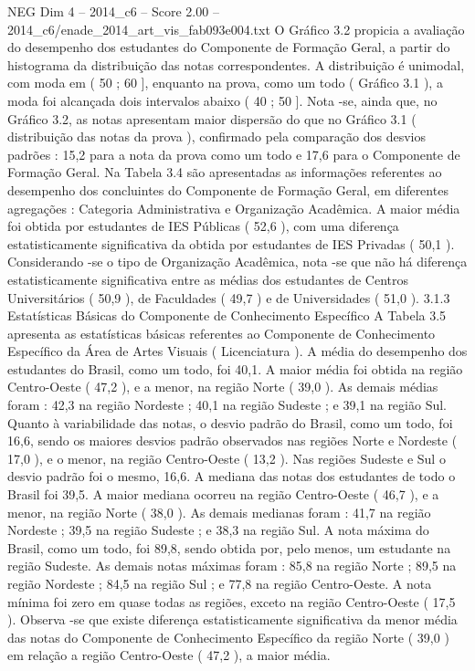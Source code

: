\begin{textsample}{NEG Dim 4 – 2014\_c6 – Score 2.00 – 2014\_c6/enade\_2014\_art\_vis\_fab093e004.txt}
O Gráfico 3.2 propicia a avaliação do desempenho dos estudantes do Componente de Formação Geral, a partir do histograma da distribuição das notas correspondentes.
A distribuição é unimodal, com moda em ( 50 ; 60 ], enquanto na prova, como um todo ( Gráfico 3.1 ), a moda foi alcançada dois intervalos abaixo ( 40 ; 50 ].
Nota -se, ainda que, no Gráfico 3.2, as notas apresentam maior dispersão do que no Gráfico 3.1 ( distribuição das notas da prova ), confirmado pela comparação dos desvios padrões : 15,2 para a nota da prova como um todo e 17,6 para o Componente de Formação Geral.
Na Tabela 3.4 são apresentadas as informações referentes ao desempenho dos concluintes do Componente de Formação Geral, em diferentes agregações : Categoria Administrativa e Organização Acadêmica.
A maior média foi obtida por estudantes de IES Públicas ( 52,6 ), com uma diferença estatisticamente significativa da obtida por estudantes de IES Privadas ( 50,1 ).
Considerando -se o tipo de Organização Acadêmica, nota -se que não há diferença estatisticamente significativa entre as médias dos estudantes de Centros Universitários ( 50,9 ), de Faculdades ( 49,7 ) e de Universidades ( 51,0 ). 3.1.3 Estatísticas Básicas do Componente de Conhecimento Específico A Tabela 3.5 apresenta as estatísticas básicas referentes ao Componente de Conhecimento Específico da Área de Artes Visuais ( Licenciatura ).
A média do desempenho dos estudantes do Brasil, como um todo, foi 40,1.
A maior média foi obtida na região Centro-Oeste ( 47,2 ), e a menor, na região Norte ( 39,0 ).
As demais médias foram : 42,3 na região Nordeste ; 40,1 na região Sudeste ; e 39,1 na região Sul.
Quanto à variabilidade das notas, o desvio padrão do Brasil, como um todo, foi 16,6, sendo os maiores desvios padrão observados nas regiões Norte e Nordeste ( 17,0 ), e o menor, na região Centro-Oeste ( 13,2 ).
Nas regiões Sudeste e Sul o desvio padrão foi o mesmo, 16,6.
A mediana das notas dos estudantes de todo o Brasil foi 39,5.
A maior mediana ocorreu na região Centro-Oeste ( 46,7 ), e a menor, na região Norte ( 38,0 ).
As demais medianas foram : 41,7 na região Nordeste ; 39,5 na região Sudeste ; e 38,3 na região Sul.
A nota máxima do Brasil, como um todo, foi 89,8, sendo obtida por, pelo menos, um estudante na região Sudeste.
As demais notas máximas foram : 85,8 na região Norte ; 89,5 na região Nordeste ; 84,5 na região Sul ; e 77,8 na região Centro-Oeste.
A nota mínima foi zero em quase todas as regiões, exceto na região Centro-Oeste ( 17,5 ).
Observa -se que existe diferença estatisticamente significativa da menor média das notas do Componente de Conhecimento Específico da região Norte ( 39,0 ) em relação a região Centro-Oeste ( 47,2 ), a maior média.

\end{textsample}
